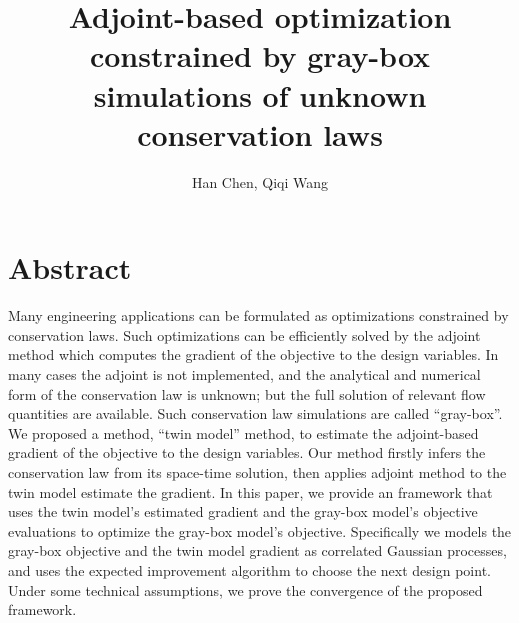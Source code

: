 \documentclass[a4paper,onecolumn]{article}
\theoremstyle{remark}
\begin{document}
\title{Adjoint-based optimization constrained by gray-box simulations of unknown conservation laws}
\author{Han Chen, Qiqi Wang}
\date{}
\maketitle
\section{Abstract}

\noindent Many engineering applications can be formulated as optimizations constrained by conservation laws.
Such optimizations can be efficiently solved by the adjoint method which computes the gradient of
the objective to the design variables. In many cases the adjoint is not implemented, and the analytical and
numerical form of the conservation law is unknown; but the full solution of relevant flow quantities are available.
Such conservation law simulations are called ``gray-box''. We proposed a method, ``twin model'' method,
to estimate the adjoint-based gradient of the objective to the design variables. 
Our method firstly infers the conservation law from its space-time solution, then
applies adjoint method to the twin model estimate the gradient. In this paper, we provide an framework that
uses the twin model's estimated gradient and the gray-box model's objective evaluations to optimize the gray-box model's 
objective. Specifically we models the gray-box objective and the twin model gradient as correlated Gaussian processes,
and uses the expected improvement algorithm to choose the next design point. 
Under some technical assumptions, we prove the convergence of the proposed framework.
\end{document}
